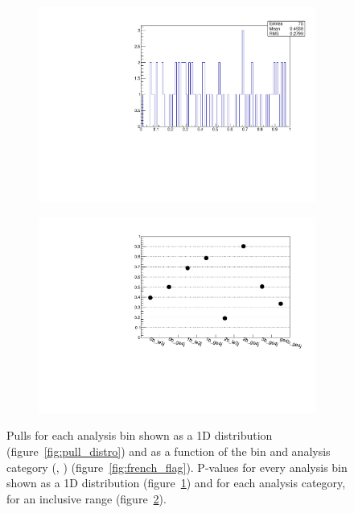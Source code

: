 \begin{figure}[h!]
  \begin{subfigure}[b]{0.46\textwidth}
    \includegraphics[width=\textwidth]{Figs/results/v0/pulls/pvalue_per_bin.pdf}
    \caption{}
    \label{fig:pvalue_distro}
  \end{subfigure}
  \begin{subfigure}[b]{0.46\textwidth}
    \includegraphics[width=\textwidth]{Figs/results/v0/pulls/pvalue_vs_cat.pdf}
    \caption{}
    \label{fig:pvalue_per_cat}
  \end{subfigure}
  \caption{Pulls for each analysis bin shown as a 1D distribution
  (figure~\ref{fig:pull_distro}) and as a function of the \HT bin and analysis
  category (\nj, \nb) (figure~\ref{fig:french_flag}). P-values for every
  analysis bin shown as a 1D distribution (figure~\ref{fig:pvalue_distro}) and
  for each analysis category, for an inclusive \HT range
  (figure~\ref{fig:pvalue_per_cat}).}
  \label{fig:pull_analysis}
\end{figure}

